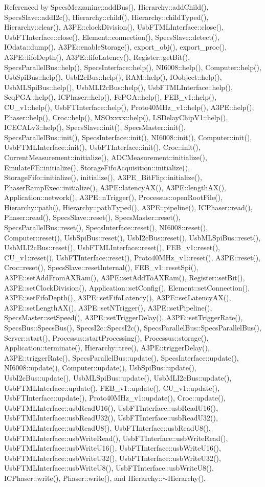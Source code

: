 Referenced by SpecsMezzanine::addBus(), Hierarchy::addChild(), SpecsSlave::addI2c(), Hierarchy::child(), Hierarchy::childTyped(), Hierarchy::clear(), A3PE::clockDivision(), UsbFTMLInterface::close(), UsbFTInterface::close(), Element::connection(), SpecsSlave::detect(), IOdata::dump(), A3PE::enableStorage(), export\_\-obj(), export\_\-proc(), A3PE::fifoDepth(), A3PE::fifoLatency(), Register::getBit(), SpecsParallelBus::help(), SpecsInterface::help(), NI6008::help(), Computer::help(), UsbSpiBus::help(), UsbI2cBus::help(), RAM::help(), IOobject::help(), UsbMLSpiBus::help(), UsbMLI2cBus::help(), UsbFTMLInterface::help(), SeqPGA::help(), ICPhaser::help(), FePGA::help(), FEB\_\-v1::help(), CU\_\-v1::help(), UsbFTInterface::help(), Proto40MHz\_\-v1::help(), A3PE::help(), Phaser::help(), Croc::help(), MSOxxxx::help(), LSDelayChipV1::help(), ICECALv3::help(), SpecsSlave::init(), SpecsMaster::init(), SpecsParallelBus::init(), SpecsInterface::init(), NI6008::init(), Computer::init(), UsbFTMLInterface::init(), UsbFTInterface::init(), Croc::init(), CurrentMeasurement::initialize(), ADCMeasurement::initialize(), EmulateFE::initialize(), StorageFifoAcquisition::initialize(), StorageFifo::initialize(), initialize(), A3PE\_\-BitFlip::initialize(), PhaserRampExec::initialize(), A3PE::latencyAX(), A3PE::lengthAX(), Application::network(), A3PE::nTrigger(), Processus::openRootFile(), Hierarchy::path(), Hierarchy::pathTyped(), A3PE::pipeline(), ICPhaser::read(), Phaser::read(), SpecsSlave::reset(), SpecsMaster::reset(), SpecsParallelBus::reset(), SpecsInterface::reset(), NI6008::reset(), Computer::reset(), UsbSpiBus::reset(), UsbI2cBus::reset(), UsbMLSpiBus::reset(), UsbMLI2cBus::reset(), UsbFTMLInterface::reset(), FEB\_\-v1::reset(), CU\_\-v1::reset(), UsbFTInterface::reset(), Proto40MHz\_\-v1::reset(), A3PE::reset(), Croc::reset(), SpecsSlave::resetInternal(), FEB\_\-v1::resetSpi(), A3PE::setAddFromAXRam(), A3PE::setAddToAXRam(), Register::setBit(), A3PE::setClockDivision(), Application::setConfig(), Element::setConnection(), A3PE::setFifoDepth(), A3PE::setFifoLatency(), A3PE::setLatencyAX(), A3PE::setLengthAX(), A3PE::setNTrigger(), A3PE::setPipeline(), SpecsMaster::setSpeed(), A3PE::setTriggerDelay(), A3PE::setTriggerRate(), SpecsBus::SpecsBus(), SpecsI2c::SpecsI2c(), SpecsParallelBus::SpecsParallelBus(), Server::start(), Processus::startProcessing(), Processus::storage(), Application::terminate(), Hierarchy::tree(), A3PE::triggerDelay(), A3PE::triggerRate(), SpecsParallelBus::update(), SpecsInterface::update(), NI6008::update(), Computer::update(), UsbSpiBus::update(), UsbI2cBus::update(), UsbMLSpiBus::update(), UsbMLI2cBus::update(), UsbFTMLInterface::update(), FEB\_\-v1::update(), CU\_\-v1::update(), UsbFTInterface::update(), Proto40MHz\_\-v1::update(), Croc::update(), UsbFTMLInterface::usbReadU16(), UsbFTInterface::usbReadU16(), UsbFTMLInterface::usbReadU32(), UsbFTInterface::usbReadU32(), UsbFTMLInterface::usbReadU8(), UsbFTInterface::usbReadU8(), UsbFTMLInterface::usbWriteRead(), UsbFTInterface::usbWriteRead(), UsbFTMLInterface::usbWriteU16(), UsbFTInterface::usbWriteU16(), UsbFTMLInterface::usbWriteU32(), UsbFTInterface::usbWriteU32(), UsbFTMLInterface::usbWriteU8(), UsbFTInterface::usbWriteU8(), ICPhaser::write(), Phaser::write(), and Hierarchy::$\sim$Hierarchy().


